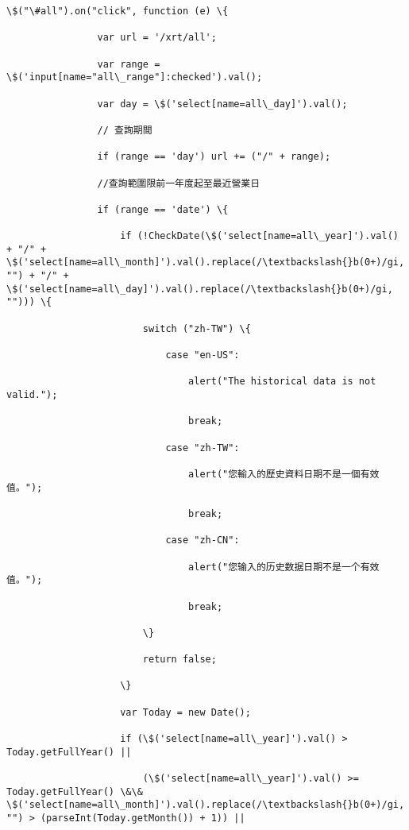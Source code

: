 \documentclass[11pt]{article}
\begin{document}
\begin{Verbatim}[commandchars=\\\{\}]
            \$("\#all").on("click", function (e) \{

                var url = '/xrt/all';

                var range = \$('input[name="all\_range"]:checked').val();

                var day = \$('select[name=all\_day]').val();

                // 查詢期間

                if (range == 'day') url += ("/" + range);

                //查詢範圍限前一年度起至最近營業日

                if (range == 'date') \{

                    if (!CheckDate(\$('select[name=all\_year]').val() + "/" + \$('select[name=all\_month]').val().replace(/\textbackslash{}b(0+)/gi, "") + "/" + \$('select[name=all\_day]').val().replace(/\textbackslash{}b(0+)/gi, ""))) \{

                        switch ("zh-TW") \{

                            case "en-US":

                                alert("The historical data is not valid.");

                                break;

                            case "zh-TW":

                                alert("您輸入的歷史資料日期不是一個有效值。");

                                break;

                            case "zh-CN":

                                alert("您输入的历史数据日期不是一个有效值。");

                                break;

                        \}

                        return false;

                    \}

                    var Today = new Date();

                    if (\$('select[name=all\_year]').val() > Today.getFullYear() ||

                        (\$('select[name=all\_year]').val() >= Today.getFullYear() \&\& \$('select[name=all\_month]').val().replace(/\textbackslash{}b(0+)/gi, "") > (parseInt(Today.getMonth()) + 1)) ||


\end{Verbatim}
\end{document}
